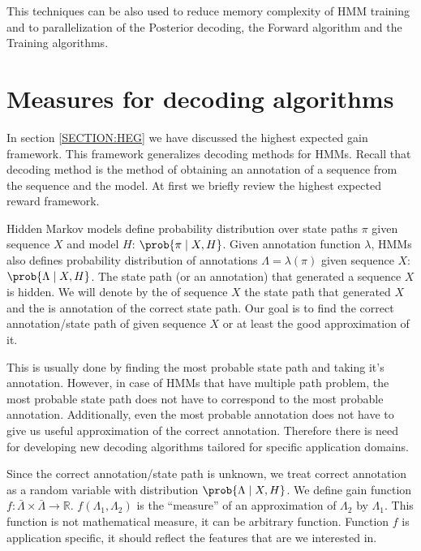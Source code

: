 This techniques can be also used to reduce memory complexity of HMM training and
to parallelization of the Posterior decoding, the Forward algorithm and the
Training algorithms.

\section{Measures for decoding algorithms}


In section \ref{SECTION:HEG} we have discussed the highest expected gain
framework. This framework generalizes decoding methods for HMMs. Recall that
decoding method is the method of obtaining an annotation of a sequence from the
sequence and the model. At first we briefly review the highest expected reward
framework.

Hidden Markov models define probability distribution over state paths $\pi$
given sequence $X$ and model $H$: $\prob{\pi\mid X,H}$. Given annotation
function $\lambda$, HMMs also defines probability distribution of annotations
$\Lambda=\lambda(\pi)$ given sequence $X$: $\prob{\Lambda\mid X,H}$.  The state
path (or an annotation) that generated a sequence $X$ is hidden.
We will denote by
the  of sequence $X$ the state path that
generated $X$ and the  is annotation of the
correct state path. Our goal is to find the correct annotation/state path of
given sequence $X$ or at least the good approximation of it.

This is usually done by finding the most probable state path and taking it's
annotation. However, in case of HMMs that have multiple path problem, 
the most probable state path does not have to correspond to the most probable
annotation. Additionally, even the most probable annotation does not have to
give us useful approximation of the correct annotation. Therefore there is need
for developing new decoding algorithms tailored for specific application
domains.


Since the correct annotation/state path is unknown, we treat correct annotation
as a random variable with distribution $\prob{\Lambda\mid X,H}$. We define gain
function $f:\bar{\Lambda}\times\bar{\Lambda}\to \mathbb{R}$.
$f(\Lambda_1,\Lambda_2)$ is the ``measure'' of an approximation of $\Lambda_2$
by $\Lambda_1$. This function is not mathematical measure, it can be arbitrary
function. Function $f$ is application specific, it should reflect the features
that are we interested in.

